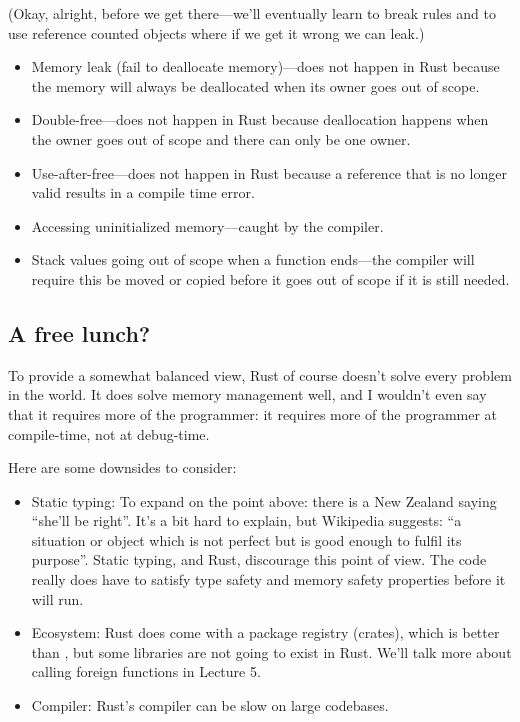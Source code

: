(Okay, alright, before we get there---we'll eventually learn to break rules and to use reference counted objects where if we get it wrong we can leak.)

\begin{itemize}
	\item Memory leak (fail to deallocate memory)---does not happen in Rust because the memory will always be deallocated when its owner goes out of scope.
	\item Double-free---does not happen in Rust because deallocation happens when the owner goes out of scope and there can only be one owner.
	\item Use-after-free---does not happen in Rust because a reference that is no longer valid results in a compile time error.
	\item Accessing uninitialized memory---caught by the compiler.
	\item Stack values going out of scope when a function ends---the compiler will require this be moved or copied before it goes out of scope if it is still needed.
\end{itemize}

\subsection*{A free lunch?}
To provide a somewhat balanced view, Rust of course doesn't solve every problem
in the world. It does solve memory management well, and I wouldn't even say that
it requires more of the programmer: it requires more of the programmer at compile-time,
not at debug-time.

Here are some downsides to consider:
\begin{itemize}
\item Static typing: To expand on the point above: there is a New Zealand saying ``she'll be right''. It's a bit hard to explain, but Wikipedia suggests: ``a situation or object which is not perfect but is good enough to fulfil its purpose''. Static typing, and Rust, discourage this point of view. The code really does have to satisfy type safety and memory safety properties before it will run.
\item Ecosystem: Rust does come with a package registry (crates), which is better than \CPP, but some libraries are not going to exist in Rust. We'll talk more about calling foreign functions in Lecture 5.
\item Compiler: Rust's compiler can be slow on large codebases.
\end{itemize}




